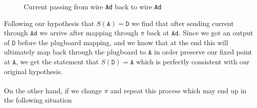 \begin{figure}[H]
\begin{minipage}{0.45\textwidth}
  \end{minipage}
  \caption{Current passing from wire \texttt{Ad} back to wire \texttt{Ad}}
  \label{fig:correct_stecker}
\end{figure}
\noindent Following our hypothesis that $S(\texttt{A}) = \texttt{D}$
we find that after sending
current through $\texttt{Ad}$ we arrive after mapping through
$\overline\pi$ back at $\texttt{Ad}$. Since we got an output of
$\texttt{D}$ before the plugboard mapping, and we know that at the
end this will ultimately map back through the plugboard to
$\texttt{A}$ in order preserve our fixed point at $\texttt{A}$, we
get the statement that $S(\texttt{D}) = \texttt{A}$ which is
perfectly consistent with our original hypothesis.
\\\\On the other hand, if we change
$\overline\pi$ and repeat this process which may end up in the
following situation
